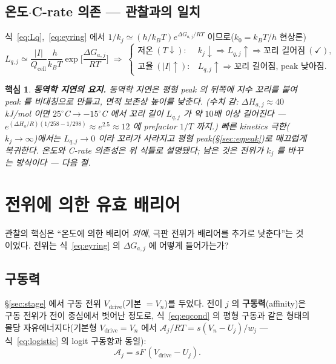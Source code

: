\documentclass[11pt,a4paper]{article}
\newtheorem*{keybox}{핵심}
\newcommand{\drive}{\mathrm{drive}}
\newcommand{\cell}{\mathrm{cell}}
\begin{document}
\subsection{온도$\cdot$C-rate 의존 — 관찰과의 일치}
식~\eqref{eq:Lq},~\eqref{eq:eyring} 에서 $1/k_j\simeq(h/k_BT)e^{\Delta G_{a,j}/RT}$ 이므로($k_0=k_BT/h$ 현상론)
\begin{equation}
L_{q,j}\simeq\frac{|I|}{Q_\cell}\frac{h}{k_BT}\exp\!\Big[\frac{\Delta G_{a,j}}{RT}\Big]
\;\Longrightarrow\;
\begin{cases}
\text{저온}\ (T\downarrow): & k_j\downarrow\Rightarrow L_{q,j}\uparrow\Rightarrow\text{꼬리 길어짐}\ (\checkmark),\\[2pt]
\text{고율}\ (|I|\uparrow): & L_{q,j}\uparrow\Rightarrow\text{꼬리 길어짐, peak 낮아짐}.
\end{cases}
\label{eq:tailTC}
\end{equation}
\begin{keybox}
\textbf{동역학 지연의 요지.} 동역학 지연은 평형 peak 의 \emph{뒤쪽}에 지수 꼬리를 붙여 peak 를 \emph{비대칭}으로 만들고, 면적
보존상 \emph{높이를 낮춘다}. (수치 감: $\Delta H_{a,j}\approx40$ kJ/mol 이면 $25^\circ$C$\to-15^\circ$C 에서 꼬리
길이 $L_{q,j}$ 가 약 $10$배 이상 길어진다 — $e^{(\Delta H_a/R)(1/258-1/298)}\approx e^{2.5}\approx12$ 에 prefactor
$1/T$ 까지.) 빠른 kinetics 극한($k_j\to\infty$)에서는 $L_{q,j}\to0$ 이라 꼬리가 사라지고 평형
peak(\S\ref{sec:eqpeak})로 매끄럽게 복귀한다. \emph{온도와 C-rate 의존성은 위 식들로 설명됐다; 남은 것은 전위가
$k_j$ 를 바꾸는 방식이다 — 다음 절.}
\end{keybox}

\section{전위에 의한 유효 배리어}\label{sec:barrier}
관찰의 핵심은 ``온도에 의한 배리어 \emph{외에}, 극판 전위가 배리어를 추가로 낮춘다''는 것이었다.
전위는 식~\eqref{eq:eyring} 의 $\Delta G_{a,j}$ 에 어떻게 들어가는가?

\subsection{구동력}
\S\ref{sec:stage} 에서 구동 전위 $V_\drive$(기본 $=V_n$)를 두었다. 전이 $j$ 의 \textbf{구동력}(affinity)은
구동 전위가 전이 중심에서 벗어난 정도로, 식~\eqref{eq:eqcond} 의 평형 구동과 같은 형태의 몰당 자유에너지다(기본형
$V_\drive=V_n$ 에서 $\mathcal A_j/RT=s(V_n-U_j)/w_j$ — 식~\eqref{eq:logistic} 의 logit 구동항과 동일):
\begin{equation}
\mathcal A_j=sF\,(V_\drive-U_j).
\label{eq:affinity}
\end{equation}
\end{document}
